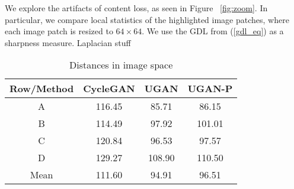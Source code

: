 We explore the artifacts of content loss, as seen in Figure ~\ref{fig:zoom}. In particular, we compare local statistics
of the highlighted image patches, where each image patch is resized to $64 \times 64$. We use the GDL
\cite{mathieu2015deep} from (\ref{gdl_eq}) as a sharpness measure. Laplacian stuff \cite{pertuz2013analysis}

\begin{table}
\centering
\caption{Distances in image space}
\begin{tabular}{| c | c | c | c |}
   \hline
   Row/Method & CycleGAN & UGAN & UGAN-P \\ \hline
   A          & 116.45 & 85.71  & 86.15  \\ \hline
   B          & 114.49 & 97.92  & 101.01 \\ \hline
   C          & 120.84 & 96.53  & 97.57  \\ \hline
   D          & 129.27 & 108.90 & 110.50 \\ \hline
   Mean       & 111.60 & 94.91  & 96.51 \\ \hline
\end{tabular}
\end{table}


